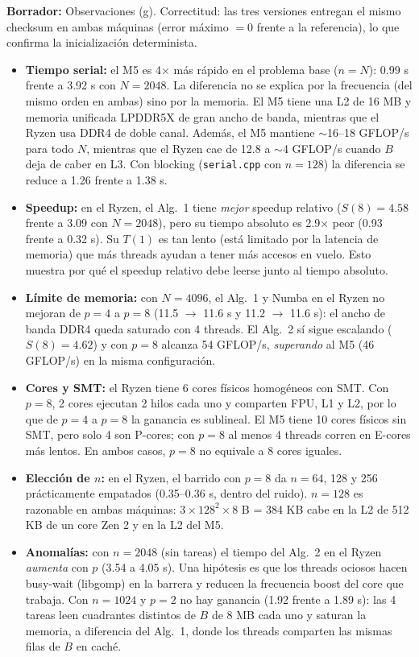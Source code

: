 \documentclass[11pt,a4paper]{article}
\newcommand{\nota}[1]{\par\noindent\colorbox{yellow!25}{\parbox{\dimexpr\linewidth-2\fboxsep}{\small\textbf{Borrador:} #1}}\par}
\begin{document}
\nota{Observaciones (g). Correctitud: las tres versiones entregan el mismo checksum en ambas máquinas (error máximo $=0$ frente a la referencia), lo que confirma la inicialización determinista.
\begin{itemize}
\item \textbf{Tiempo serial:} el M5 es 4$\times$ más rápido en el problema base ($n=N$): 0.99 s frente a 3.92 s con $N=2048$. La diferencia no se explica por la frecuencia (del mismo orden en ambas) sino por la memoria. El M5 tiene una L2 de 16 MB y memoria unificada LPDDR5X de gran ancho de banda, mientras que el Ryzen usa DDR4 de doble canal. Además, el M5 mantiene $\sim$16--18 GFLOP/s para todo $N$, mientras que el Ryzen cae de 12.8 a $\sim$4 GFLOP/s cuando $B$ deja de caber en L3. Con blocking (\texttt{serial.cpp} con $n=128$) la diferencia se reduce a 1.26 frente a 1.38 s.
\item \textbf{Speedup:} en el Ryzen, el Alg.~1 tiene \emph{mejor} speedup relativo ($S(8)=4.58$ frente a 3.09 con $N=2048$), pero su tiempo absoluto es 2.9$\times$ peor (0.93 frente a 0.32 s). Su $T(1)$ es tan lento (está limitado por la latencia de memoria) que más threads ayudan a tener más accesos en vuelo. Esto muestra por qué el speedup relativo debe leerse junto al tiempo absoluto.
\item \textbf{Límite de memoria:} con $N=4096$, el Alg.~1 y Numba en el Ryzen no mejoran de $p=4$ a $p=8$ (11.5 $\to$ 11.6 s y 11.2 $\to$ 11.6 s): el ancho de banda DDR4 queda saturado con 4 threads. El Alg.~2 sí sigue escalando ($S(8)=4.62$) y con $p=8$ alcanza 54 GFLOP/s, \emph{superando} al M5 (46 GFLOP/s) en la misma configuración.
\item \textbf{Cores y SMT:} el Ryzen tiene 6 cores físicos homogéneos con SMT. Con $p=8$, 2 cores ejecutan 2 hilos cada uno y comparten FPU, L1 y L2, por lo que de $p=4$ a $p=8$ la ganancia es sublineal. El M5 tiene 10 cores físicos sin SMT, pero solo 4 son P-cores; con $p=8$ al menos 4 threads corren en E-cores más lentos. En ambos casos, $p=8$ no equivale a 8 cores iguales.
\item \textbf{Elección de $n$:} en el Ryzen, el barrido con $p=8$ da $n=64$, 128 y 256 prácticamente empatados (0.35--0.36 s, dentro del ruido). $n=128$ es razonable en ambas máquinas: $3\times128^2\times8$ B = 384 KB cabe en la L2 de 512 KB de un core Zen 2 y en la L2 del M5.
\item \textbf{Anomalías:} con $n=2048$ (sin tareas) el tiempo del Alg.~2 en el Ryzen \emph{aumenta} con $p$ (3.54 a 4.05 s). Una hipótesis es que los threads ociosos hacen busy-wait (libgomp) en la barrera y reducen la frecuencia boost del core que trabaja. Con $n=1024$ y $p=2$ no hay ganancia (1.92 frente a 1.89 s): las 4 tareas leen cuadrantes distintos de $B$ de 8 MB cada uno y saturan la memoria, a diferencia del Alg.~1, donde los threads comparten las mismas filas de $B$ en caché.

\end{itemize}}
\end{document}
